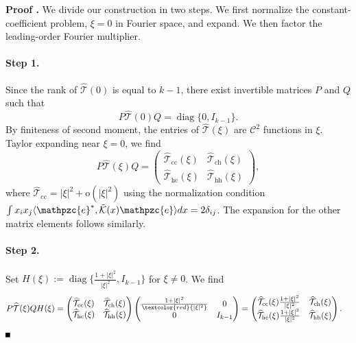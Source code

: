 \documentclass[10pt]{article}
\newenvironment{Proof}[1][\unskip]%
 {\begin{trivlist} \item[]{\bf Proof #1. }}%
 {\hspace*{\fill}$\rule{.4\baselineskip}{.4\baselineskip}$\end{trivlist}}
\newcommand{\rmo}{\mathrm{o}}
\newcommand{\K}{\mathcal{K}}
\newcommand{\That}{\widehat{\mathcal{T}}}
\newcommand{\e}{\mathpzc{e}}
\newcommand{\diag}{\operatorname{diag}}
\begin{document}
\begin{Proof}
We divide our construction in two steps. We first normalize the constant-coefficient problem, $\xi=0$ in Fourier space, and expand. We then factor the leading-order Fourier multiplier. 
 
 

\paragraph{Step 1.}

Since the rank of $\widehat{\mathcal{T}}(0)$ is equal to $k-1$, there exist invertible matrices $P$ and $Q$ such that
\[
P\That(0)Q = \diag\{0,I_{k-1}\}.
\]
By finiteness of second moment, the entries of $\That(\xi)$ are $\mathscr{C}^2$ functions in $\xi$. Taylor expanding near $\xi = 0$, we find 
\[
P\That(\xi)Q = \begin{pmatrix}
\That_\mathrm{cc}(\xi)& \That_\mathrm{ch}(\xi)\\
\That_\mathrm{hc}(\xi)& \That_\mathrm{hh}(\xi) 
\end{pmatrix},
\]
where $\That_\mathrm{cc} = |\xi|^2+\rmo(|\xi|^2)$ using the normalization condition $\int x_ix_j\langle {\e}^*, \tilde{\K}(x){\e}\rangle dx = 2\delta_{ij}$. The expansion for the other matrix elements follows similarly. 



\paragraph{Step 2.} Set $
H(\xi) := \diag\{\frac{1+|\xi|^2}{|\xi|^2}, I_{k-1}\}$ for $\xi \neq 0$. 
We find
\begin{align*}
P\That(\xi)QH(\xi) &= \begin{pmatrix}
\That_\mathrm{cc}(\xi)& \That_\mathrm{ch}(\xi)\\
\That_\mathrm{hc}(\xi)& \That_\mathrm{hh}(\xi) 
\end{pmatrix} \begin{pmatrix}
\frac{1+|\xi|^2}{\textcolor{red}{|\xi|^2}}&0 \\
0& I_{k-1} 
\end{pmatrix}
= \begin{pmatrix}
\That_\mathrm{cc}(\xi)\frac{1+|\xi|^2}{|\xi|^2} & \That_\mathrm{ch}(\xi)\\
\That_\mathrm{hc}(\xi)\frac{1+|\xi|^2}{|\xi|^2} & \That_\mathrm{hh}(\xi)
\end{pmatrix}.
\end{align*}


\end{Proof}
\end{document}
